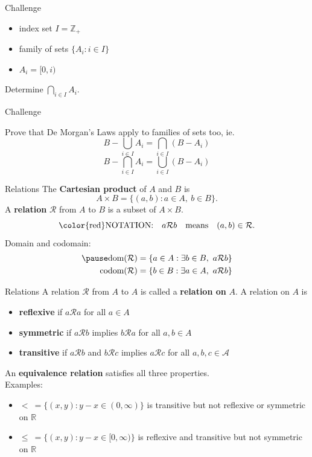\documentclass{beamer}
\begin{document}
\begin{frame}{Challenge}
\begin{itemize}
\item index set $I = \mathbb{Z}_+$
\item family of sets $\{A_i: i\in I\}$
\item $A_i = [0,i)$
\end{itemize}
\begin{prob}
Determine $\bigcap_{i\in I} A_i$.
\end{prob}
\end{frame}

\begin{frame}{Challenge}
\begin{prob}
Prove that De Morgan's Laws apply to families of sets too, ie.
$$B-\bigcup_{i\in I} A_i = \bigcap_{i\in I} (B-A_i)$$
\pause
$$B-\bigcap_{i\in I} A_i = \bigcup_{i\in I} (B-A_i)$$
\end{prob}
\end{frame}

\begin{frame}{Relations}
The \textbf{Cartesian product} of $A$ and $B$ is
$$A\times B = \{(a,b): a\in A,\ b\in B\}.$$
\pause
A \textbf{relation} $\mathcal R$ from $A$ to $B$ is a subset of $A\times B$.\\
\pause
$$\text{\color{red}NOTATION:}\quad a\mathcal R b\quad\text{means}\quad (a,b)\in \mathcal R.$$
\pause
Domain and codomain:
\pause
\begin{align*}
\pause
\text{dom}(\mathcal{R}) &= \{a\in A: \exists b\in B,\ a\mathcal R b\}\\
\text{codom}(\mathcal{R}) &= \{b\in B: \exists a\in A,\ a\mathcal R b\}
\end{align*}
\end{frame}

\begin{frame}{Relations}
A relation $\mathcal R$ from $A$ to $A$ is called a \textbf{relation on} $A$.  A relation on $A$ is
\begin{itemize}
\pause
\item \textbf{reflexive} if $a\mathcal Ra$ for all $a\in A$
\pause
\item \textbf{symmetric} if $a\mathcal Rb$ implies $b\mathcal Ra$ for all $a,b\in A$
\pause
\item \textbf{transitive} if $a\mathcal Rb$ and $b\mathcal Rc$ implies $a\mathcal Rc$ for all $a,b,c\in\mathcal A$
\end{itemize}
\pause
An \textbf{equivalence relation} satisfies all three properties.\\
\pause
Examples:
\pause
\begin{itemize}
\pause
\item $<\ = \{(x,y): y-x\in (0,\infty)\}$ is transitive but not reflexive or symmetric on $\mathbb{R}$
\pause
\item $\leq\ = \{(x,y): y-x\in [0,\infty)\}$ is reflexive and transitive but not symmetric on $\mathbb{R}$
\end{itemize}
\end{frame}
\end{document}
